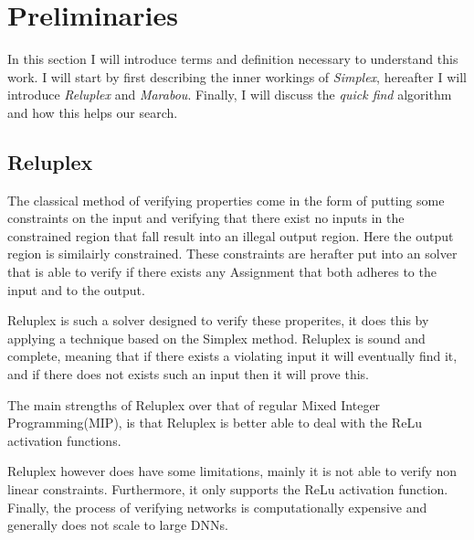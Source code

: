 \documentclass[../main.tex]{subfiles}
\begin{document}
\section{Preliminaries}\label{sec:preliminaries}
In this section I will introduce terms and definition necessary to understand this work. I will start by first describing the inner workings of \textit{Simplex}, hereafter I will introduce \textit{Reluplex} and \textit{Marabou}. Finally, I will discuss the \textit{quick find} algorithm and how this helps our search.



\subsection*{Reluplex}
The classical method of verifying properties come in the form of putting some constraints on the input and verifying that there exist no inputs in the constrained region that fall result into an illegal output region. Here the output region is similairly constrained. These constraints are herafter put into an solver that is able to verify if there exists any Assignment that both adheres to the input and to the output.

Reluplex is such a solver designed to verify these properites, it does this by applying a technique based on the Simplex method. Reluplex is sound and complete, meaning that if there exists a violating input it will eventually find it, and if there does not exists such an input then it will prove this.

The main strengths of Reluplex over that of regular Mixed Integer Programming(MIP), is that Reluplex is better able to deal with the ReLu activation functions. 

Reluplex however does have some limitations, mainly it is not able to verify non linear constraints. Furthermore, it only supports the ReLu activation function. Finally, the process of verifying networks is computationally expensive and generally does not scale to large DNNs.\cite{katzReluplexEfficientSMT2017}
\end{document}
